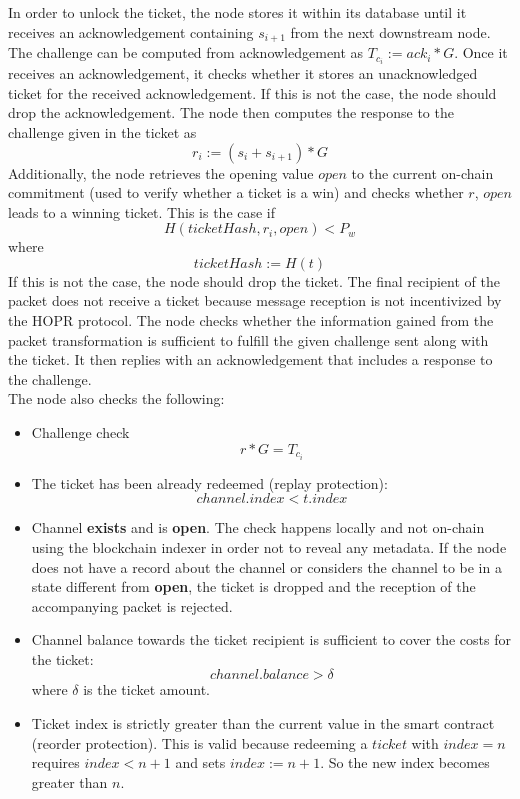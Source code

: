 In order to unlock the ticket, the node stores it within its database until it receives an acknowledgement containing $s_{i+1}$ from the next downstream node. 
The challenge can be computed from acknowledgement as $T_{c_i}:=ack_i*G$.
\newline Once it receives an acknowledgement, it checks whether it stores an unacknowledged ticket for the received acknowledgement. 
If this is not the case, the node should drop the acknowledgement.  
\newline The node then computes the response to the challenge given in the ticket as $$r_i:=(s_i+s_{i+1})*G$$
Additionally, the node retrieves the opening value $open$ to the current on-chain commitment (used to verify whether a ticket is a win) and checks whether $r$, $open$ leads to a winning ticket. 
This is the case if $$H( ticketHash, r_i, open ) <P_w$$ where $$ticketHash:=H(t)$$
If this is not the case, the node should drop the ticket. 
The final recipient of the packet does not receive a ticket because message reception is not incentivized by the HOPR protocol.
\newline The node checks whether the information gained from the packet transformation is sufficient to fulfill the given challenge sent along with the ticket. It then replies with an acknowledgement that includes a response to the challenge.
\\ The node also checks the following:
\begin{itemize}
    \item Challenge check $$r*G=T_{c_i}$$
    \item The ticket has been already redeemed (replay protection): $$channel.index <t.index$$
    \item Channel \textbf{exists} and is \textbf{open}. The check happens locally and not on-chain using the blockchain indexer in order not to reveal any metadata. If the node does not have a record about the channel or considers the channel to be in a state different from \textbf{open}, the ticket is dropped and the reception of the accompanying packet is rejected.
    \item Channel balance towards the ticket recipient is sufficient to cover the costs for the ticket: $$ channel.balance>\delta$$ where $\delta$ is the ticket amount. 
    \item Ticket index is strictly greater than the current value in the smart contract (reorder protection). This is valid because redeeming a $ticket$ with $index=n$ requires $index < n+1$ and sets $index := n+1$. So the new index becomes greater than $n$.


\end{itemize}  








